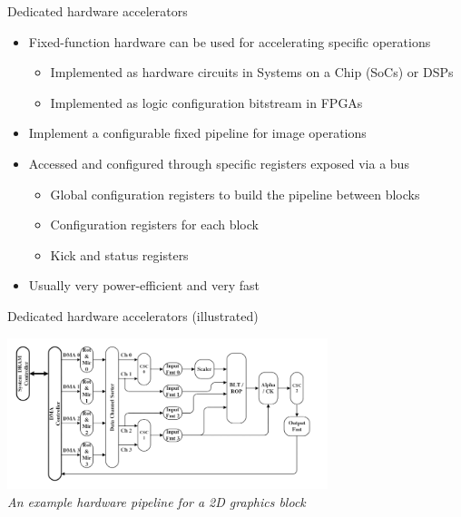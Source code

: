 \begin{frame}{Dedicated hardware accelerators}
  \begin{itemize}
  \item Fixed-function hardware can be used for accelerating specific operations
  \begin{itemize}
    \item Implemented as hardware circuits in Systems on a Chip (SoCs) or DSPs
    \item Implemented as logic configuration bitstream in FPGAs
  \end{itemize}
  \item Implement a configurable fixed pipeline for image operations
  \item Accessed and configured through specific registers exposed via a bus
    \begin{itemize}
    \item Global configuration registers to build the pipeline between blocks
    \item Configuration registers for each block
    \item Kick and status registers
    \end{itemize}
  \item Usually very power-efficient and very fast
  \end{itemize}
\end{frame}

\begin{frame}{Dedicated hardware accelerators (illustrated)}
  \begin{center}
    \includegraphics[width=0.7\textwidth]{slides/graphics-hardware/g2d-block.png}\\
    \textit{An example hardware pipeline for a 2D graphics block}\\
  \end{center}
\end{frame}

